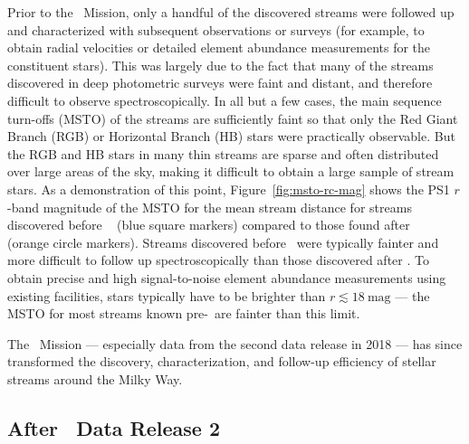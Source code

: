 \documentclass[final,5p,times,twocolumn,authoryear]{elsarticle}
\begin{document}
Prior to the \gaia\ Mission, only a handful of the discovered streams were followed up
and characterized with subsequent observations or surveys (for example, to obtain radial
velocities or detailed element abundance measurements for the constituent stars).
This was largely due to the fact that many of the streams discovered in deep photometric
surveys were faint and distant, and therefore difficult to observe spectroscopically.
In all but a few cases, the main sequence turn-offs (MSTO) of the streams are
sufficiently faint so that only the Red Giant Branch (RGB) or Horizontal Branch (HB)
stars were practically observable.
But the RGB and HB stars in many thin streams are sparse and often distributed over
large areas of the sky, making it difficult to obtain a large sample of stream stars.
As a demonstration of this point, Figure~\ref{fig:msto-rc-mag} shows the PS1 $r$-band
magnitude of the MSTO for the mean stream distance for streams discovered before \gaia\
 (blue square markers) compared to those found after \gaia\  (orange circle
markers).
Streams discovered before \gaia\ were typically fainter and more difficult to follow up
spectroscopically than those discovered after \gaia.
To obtain precise and high signal-to-noise element abundance measurements using existing
facilities, stars typically have to be brighter than $r \lesssim 18~\textrm{mag}$ --- the
MSTO for most streams known pre-\gaia\ are fainter than this limit.

The \gaia\ Mission --- especially data from the second data release in 2018 --- has
since transformed the discovery, characterization, and follow-up efficiency of stellar
streams around the Milky Way.


\subsection{After \gaia\ Data Release 2}
\end{document}
